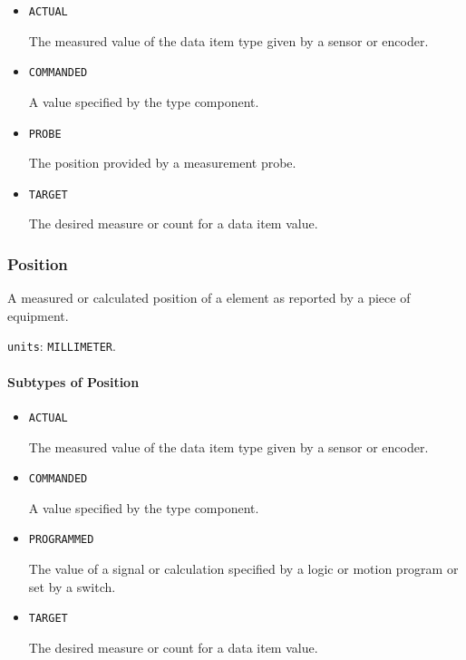 \begin{itemize}

\item \texttt{ACTUAL}


The measured value of the data item type given by a sensor or encoder.

\item \texttt{COMMANDED}


A value specified by the  type component.

\item \texttt{PROBE}


The position provided by a measurement probe.

\item \texttt{TARGET}


The desired measure or count for a data item value.


\end{itemize}







\subsubsection{Position}
\label{sec:Position}



A measured or calculated position of a  element as reported by a piece of equipment.


\texttt{units}: \texttt{MILLIMETER}.

\paragraph{Subtypes of Position}\mbox{}
\label{sec:Subtypes of Position}

\begin{itemize}

\item \texttt{ACTUAL}


The measured value of the data item type given by a sensor or encoder.

\item \texttt{COMMANDED}


A value specified by the  type component.

\item \texttt{PROGRAMMED}


The value of a signal or calculation specified by a logic or motion program or set by a switch.

\item \texttt{TARGET}


The desired measure or count for a data item value.


\end{itemize}







